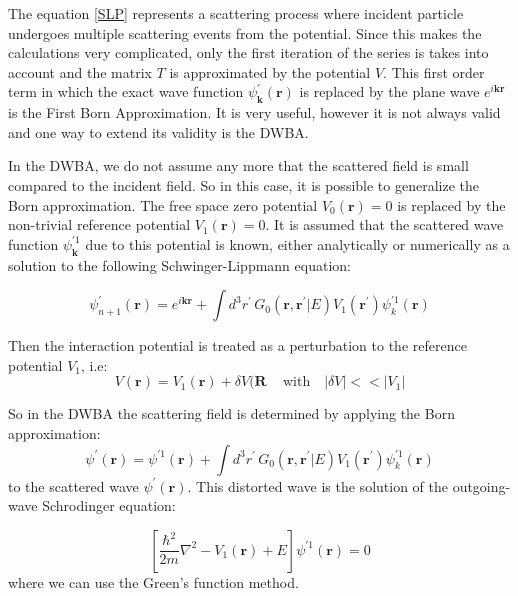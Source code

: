 The equation \eqref{SLP} represents a scattering process where incident particle undergoes multiple scattering events from the potential. Since this makes the calculations very complicated, only the first iteration of the series is takes into account and the matrix $ T $ is approximated by the potential $ V $. This first order term in which the exact wave function $ \psi^{'}_{\mathbf{k}}(\mathbf{r}) $ is replaced by the plane wave $ e^{i\mathbf{k}\mathbf{r}} $ is the First Born Approximation. It is very useful, however it is not always valid and one way to extend its validity is the DWBA. 

In the DWBA, we do not assume any more that the scattered field is small compared to the incident field. So in this case, it is possible to generalize the Born approximation. The free space zero potential $ V_0(\mathbf{r}) = 0 $ is replaced by the non-trivial reference potential $ V_1(\mathbf{r}) = 0 $. It is assumed that the scattered wave function $ \psi_{\mathbf{k}}^{'1} $ due to this potential is known, either analytically or numerically as a solution to the following Schwinger-Lippmann equation:

\begin{equation}
\psi^{'}_{n+1}(\mathbf{r}) = e^{i\mathbf{k}\mathbf{r}} + \int{d^3r^{'}\,G_0(\mathbf{r}, \mathbf{r}^{'} | E)V_1(\mathbf{r}^{'})\psi^{'1}_k(\mathbf{r}) }
\end{equation}

Then the interaction potential is treated as a perturbation to the reference potential $ V_1 $, i.e:
\begin{equation}
V(\mathbf{r}) = V_1(\mathbf{r}) + \delta V(\mathbf{R} \,\,\,\,\,\text{ with }\,\,\,\,\left|\delta V\right| << \left|V_1\right|
\end{equation}

So in the DWBA the scattering field is determined by applying the Born approximation:
\begin{equation}
\psi^{'}(\mathbf{r}) = \psi^{'1}(\mathbf{r}) + \int{d^3r^{'}\,G_0(\mathbf{r}, \mathbf{r}^{'}| E)V_1(\mathbf{r}^{'})\psi^{'1}_k(\mathbf{r}) }
\end{equation}
to the scattered wave $ \psi^{'}(\mathbf{r}) $. This distorted wave is the solution of the outgoing-wave Schrodinger equation:

\begin{equation}
\left[\frac{\hbar^2}{2m}\nabla^2 - V_1(\mathbf{r}) + E \right]\psi^{'1}(\mathbf{r}) = 0
\end{equation}
where we can use the Green's function method.

